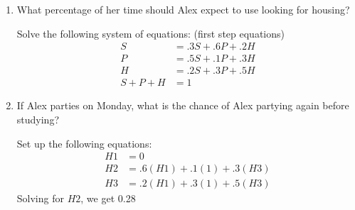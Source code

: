 \begin{enumerate}[label=(\alph*)]
\item What percentage of her time should Alex expect to use looking 
for housing?
\begin{solution}[5cm]
Solve the following system of equations: (first step equations)
\begin{equation}
\begin{split}
S &= .3S + .6P + .2H \\ \nonumber
P &= .5S + .1P + .3H \\
H &= .2S + .3P + .5H \\
S + P + H &= 1
\end{split}
\end{equation}
\end{solution}

\item If Alex parties on Monday, what is the chance of Alex partying 
again before studying?
\begin{solution}[3cm]
Set up the following equations:
\begin{equation}
\begin{split}
H1 &= 0 \\ \nonumber
H2 &= .6(H1) + .1(1) + .3(H3) \\
H3 &= .2(H1) + .3(1) + .5(H3)
\end{split}
\end{equation}
Solving for $H2$, we get 0.28
\end{solution}

\end{enumerate}